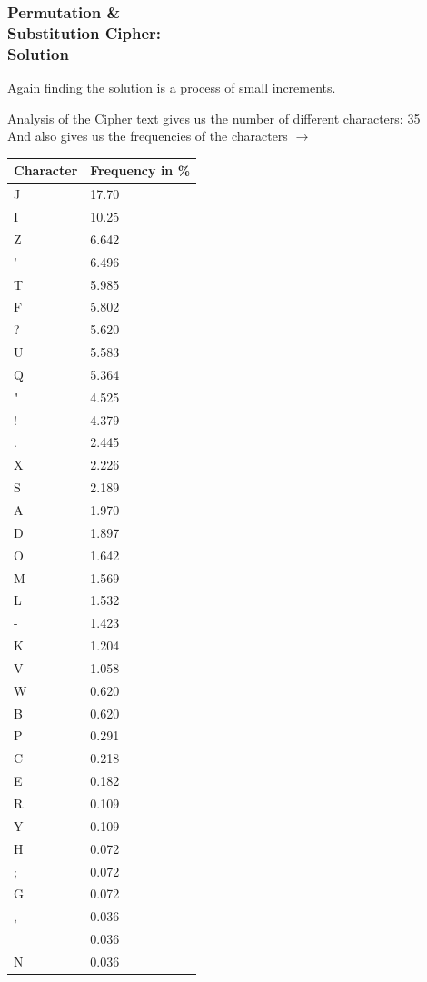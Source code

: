 \documentclass{uva-inf-presentation}
\begin{document}
\begin{frame}
\frametitle{Permutation \&\\ Substitution Cipher:\\ Solution}
Again finding the solution is a process of small increments.

\begin{minipage}{0.55\linewidth}
Analysis of the Cipher text gives us the number of different characters:
35\\
And also gives us the frequencies of the characters $\rightarrow$
\end{minipage}%
\begin{minipage}{0.45\linewidth}
\centering
{\fontsize{3.5pt}{4.5pt}\selectfont
\begin{tabular}{ll}\toprule
Character & Frequency in \%     \\
\midrule
J & 17.70 \\
I & 10.25 \\
Z & 6.642 \\
' & 6.496 \\
T & 5.985 \\
F & 5.802 \\
? & 5.620 \\
U & 5.583 \\
Q & 5.364 \\
" & 4.525 \\
! & 4.379 \\
. & 2.445 \\
X & 2.226 \\
S & 2.189 \\
A & 1.970 \\
D & 1.897 \\
O & 1.642 \\
M & 1.569 \\
L & 1.532 \\
- & 1.423 \\
K & 1.204 \\
V & 1.058 \\
W & 0.620 \\
B & 0.620 \\
P & 0.291 \\
C & 0.218 \\
E & 0.182 \\
R & 0.109 \\
Y & 0.109 \\
H & 0.072 \\
; & 0.072 \\
G & 0.072 \\
, & 0.036 \\
  & 0.036 \\
N & 0.036 \\ \bottomrule
\end{tabular}}
\end{minipage}
\end{frame}
\end{document}
